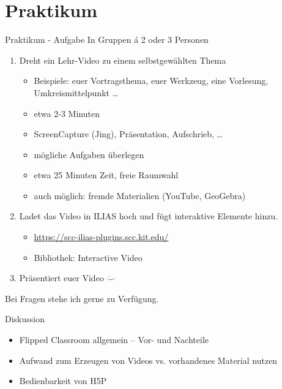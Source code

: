 \documentclass[18pt]{beamer}
\begin{document}
\section{Praktikum}
\begin{frame}{Praktikum - Aufgabe}
    In Gruppen á 2 oder 3 Personen
    \begin{enumerate}[<+->]
        \item Dreht ein Lehr-Video zu einem selbstgewählten Thema
            \begin{itemize}
                \item Beispiele: euer Vortragsthema, euer Werkzeug, eine Vorlesung, Umkreismittelpunkt \dots
                \item etwa 2-3 Minuten
                \item ScreenCapture (Jing), Präsentation, Aufschrieb, \dots
                \item mögliche Aufgaben überlegen
                \item etwa 25 Minuten Zeit, freie Raumwahl
                \item auch möglich: fremde Materialien (YouTube, GeoGebra)
            \end{itemize}
        \item Ladet das Video in ILIAS hoch und fügt interaktive Elemente hinzu.
            \begin{itemize}
                \item \url{https://scc-ilias-plugins.scc.kit.edu/}
                \item Bibliothek: Interactive Video
            \end{itemize}
        \item Präsentiert euer Video $\ddot{\smile}$
    \end{enumerate}
    \vfill

    \pause
    Bei Fragen stehe ich gerne zu Verfügung.
\end{frame}

\begin{frame}{Diskussion}
    \begin{itemize}[<+->]
        \item Flipped Classroom allgemein -- Vor- und Nachteile
        \item Aufwand zum Erzeugen von Videos vs. vorhandenes Material nutzen
        \item Bedienbarkeit von H5P
    \end{itemize}
\end{frame}
\end{document}
